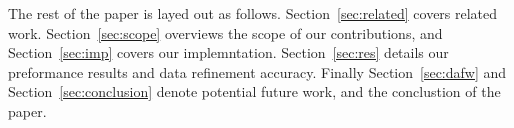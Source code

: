 The rest of the paper is layed out as follows.
Section~\ref{sec:related} covers related work. Section~\ref{sec:scope}
overviews the scope of our contributions, and Section~\ref{sec:imp}
covers our implemntation. Section~\ref{sec:res} details our
preformance results and data refinement accuracy. Finally
Section~\ref{sec:dafw} and Section~\ref{sec:conclusion} denote
potential future work, and the conclustion of the paper.
